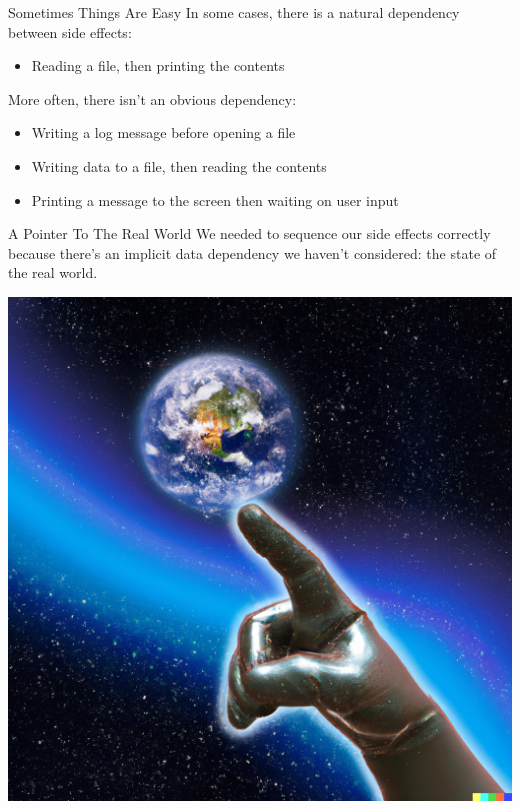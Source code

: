 \documentclass[10pt, presentation, colorlinks]{beamer}
\begin{document}
\begin{frame}[label={sec:org87d0103}]{Sometimes Things Are Easy}
In some cases, there is a natural dependency between side effects:

\bigskip
\pause
\begin{itemize}
\item Reading a file, then printing the contents
\end{itemize}

\bigskip
\pause
More often, there isn't an obvious dependency:

\bigskip
\pause
\begin{itemize}
\item Writing a log message before opening a file
\item Writing data to a file, then reading the contents
\item Printing a message to the screen then waiting on user input
\end{itemize}
\end{frame}

\begin{frame}[label={sec:orgbdb85a1}]{A Pointer To The Real World}
We needed to \alert{sequence} our side effects correctly because there's an implicit data dependency we haven't considered: \alert{the state of the real world}.

\bigskip
\pause
\begin{center}
\includegraphics[height=0.4\textheight]{./img/pointing-to-the-real-world.png}
\end{center}
\end{frame}
\end{document}
